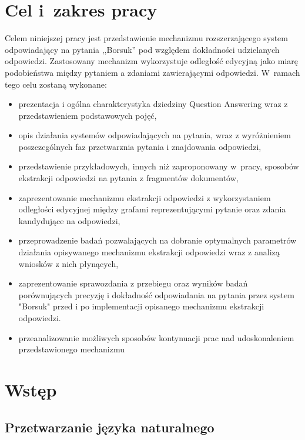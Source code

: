 \documentclass[a4paper, twoside, 12pt]{report}
\begin{document}
\tableofcontents

\listoffigures

\chapter{Cel i~zakres pracy}
    Celem niniejszej pracy jest przedstawienie mechanizmu rozszerzającego system odpowiadający na pytania ,,Borsuk''
    pod względem dokładności udzielanych odpowiedzi. Zastosowany mechanizm wykorzystuje odległość edycyjną jako miarę
    podobieństwa między pytaniem a zdaniami zawierającymi odpowiedzi. W~ramach tego celu zostaną wykonane:
    \begin{itemize}
        \item prezentacja i ogólna charakterystyka dziedziny Question Answering wraz z przedstawieniem podstawowych
            pojęć,
        \item opis działania systemów odpowiadających na pytania, wraz z wyróżnieniem poszczególnych faz przetwarznia
            pytania i znajdowania odpowiedzi,
        \item przedstawienie przykładowych, innych niż zaproponowany w~pracy,
            sposobów ekstrakcji odpowiedzi na pytania z fragmentów dokumentów,
        \item zaprezentowanie mechanizmu ekstrakcji odpowiedzi z wykorzystaniem odległości edycyjnej między grafami
            reprezentującymi pytanie oraz zdania kandydujące na odpowiedzi,
        \item przeprowadzenie badań pozwalających na dobranie optymalnych parametrów działania opisywanego
            mechanizmu ekstrakcji odpowiedzi wraz z analizą wniosków z nich płynących,
       \item zaprezentowanie sprawozdania z przebiegu oraz wyników badań porównujących precyzję i dokładność
           odpowiadania na pytania przez system "Borsuk" przed i po implementacji opisanego mechanizmu ekstrakcji
           odpowiedzi.
       \item przeanalizowanie możliwych sposobów kontynuacji prac nad udoskonaleniem przedstawionego mechanizmu

    \end{itemize}

\chapter{Wstęp}
    \section{Przetwarzanie języka naturalnego}
\end{document}
